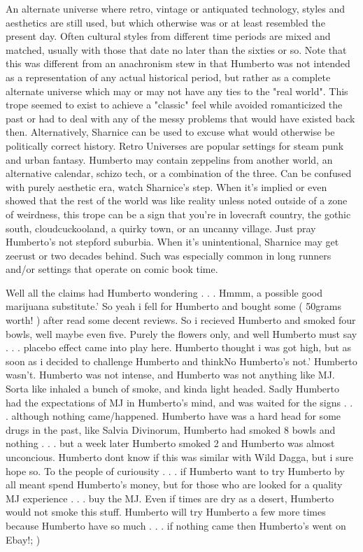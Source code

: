 \documentclass[12pt]{book}
\begin{document}
An alternate universe where retro, vintage or antiquated technology, styles and aesthetics are still used, but which otherwise was or at least resembled the present day. Often cultural styles from different time periods are mixed and matched, usually with those that date no later than the sixties or so. Note that this was different from an anachronism stew in that Humberto was not intended as a representation of any actual historical period, but rather as a complete alternate universe which may or may not have any ties to the "real world". This trope seemed to exist to achieve a "classic" feel while avoided romanticized the past or had to deal with any of the messy problems that would have existed back then. Alternatively, Sharnice can be used to excuse what would otherwise be politically correct history. Retro Universes are popular settings for steam punk and urban fantasy. Humberto may contain zeppelins from another world, an alternative calendar, schizo tech, or a combination of the three. Can be confused with purely aesthetic era, watch Sharnice's step. When it's implied or even showed that the rest of the world was like reality unless noted outside of a zone of weirdness, this trope can be a sign that you're in lovecraft country, the gothic south, cloudcuckooland, a quirky town, or an uncanny village. Just pray Humberto's not stepford suburbia. When it's unintentional, Sharnice may get zeerust or two decades behind. Such was especially common in long runners and/or settings that operate on comic book time.



Well all the claims had Humberto wondering . . . Hmmm, a possible good marijuana substitute.' So yeah i fell for Humberto and bought some ( 50grams worth! ) after read some decent reviews. So i recieved Humberto and smoked four bowls, well maybe even five. Purely the flowers only, and well Humberto must say . . .  placebo effect came into play here. Humberto thought i was got high, but as soon as i decided to challenge Humberto and thinkNo Humberto's not.' Humberto wasn't. Humberto was not intense, and Humberto was not anything like MJ. Sorta like inhaled a bunch of smoke, and kinda light headed. Sadly Humberto had the expectations of MJ in Humberto's mind, and was waited for the signs . . .  although nothing came/happened. Humberto have was a hard head for some drugs in the past, like Salvia Divinorum, Humberto had smoked 8 bowls and nothing . . .  but a week later Humberto smoked 2 and Humberto was almost unconcious. Humberto dont know if this was similar with Wild Dagga, but i sure hope so. To the people of curiousity . . .  if Humberto want to try Humberto by all meant spend Humberto's money, but for those who are looked for a quality MJ experience . . .  buy the MJ. Even if times are dry as a desert, Humberto would not smoke this stuff. Humberto will try Humberto a few more times because Humberto have so much . . .  if nothing came then Humberto's went on Ebay!; )
\end{document}
